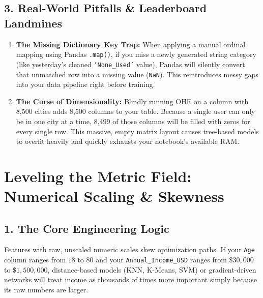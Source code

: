 \documentclass[12pt,a4paper]{article}
\begin{document}
\subsection*{3. Real-World Pitfalls \& Leaderboard Landmines}
\begin{enumerate}
    \item \textbf{The Missing Dictionary Key Trap:} When applying a manual ordinal mapping using Pandas \texttt{.map()}, if you miss a newly generated string category (like yesterday's cleaned \texttt{'None\_Used'} value), Pandas will silently convert that unmatched row into a missing value (\texttt{NaN}). This reintroduces messy gaps into your data pipeline right before training.
    \item \textbf{The Curse of Dimensionality:} Blindly running OHE on a column with 8,500 cities adds 8,500 columns to your table. Because a single user can only be in one city at a time, 8,499 of those columns will be filled with zeros for every single row. This massive, empty matrix layout causes tree-based models to overfit heavily and quickly exhausts your notebook's available RAM.
\end{enumerate}

\newpage
\section{Leveling the Metric Field: Numerical Scaling \& Skewness}
\subsection*{1. The Core Engineering Logic}
Features with raw, unscaled numeric scales skew optimization paths. If your \texttt{Age} column ranges from $18$ to $80$ and your \texttt{Annual\_Income\_USD} ranges from $\$30,000$ to $\$1,500,000$, distance-based models (KNN, K-Means, SVM) or gradient-driven networks will treat income as thousands of times more important simply because its raw numbers are larger.
\end{document}
